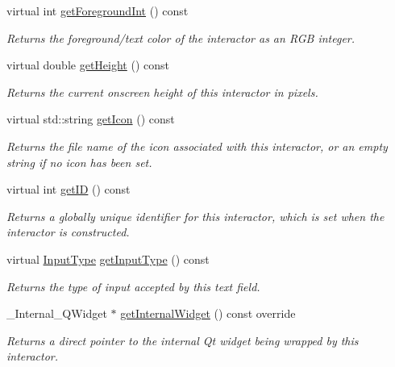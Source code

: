 \begin{DoxyCompactItemize}
virtual int \mbox{\hyperlink{classGInteractor_ac3b12ab385a6ef9ae90fc879860ba726}{get\+Foreground\+Int}} () const
\begin{DoxyCompactList}\small\item\em Returns the foreground/text color of the interactor as an R\+GB integer. \end{DoxyCompactList}\item 
virtual double \mbox{\hyperlink{classGInteractor_a1e7e353362434072875264cf95629f99}{get\+Height}} () const
\begin{DoxyCompactList}\small\item\em Returns the current onscreen height of this interactor in pixels. \end{DoxyCompactList}\item 
virtual std\+::string \mbox{\hyperlink{classGInteractor_aaed62a73004939a64da6f0eb9eb64d73}{get\+Icon}} () const
\begin{DoxyCompactList}\small\item\em Returns the file name of the icon associated with this interactor, or an empty string if no icon has been set. \end{DoxyCompactList}\item 
virtual int \mbox{\hyperlink{classGInteractor_a9c9659a6c6ba66b4107ba59c95a24241}{get\+ID}} () const
\begin{DoxyCompactList}\small\item\em Returns a globally unique identifier for this interactor, which is set when the interactor is constructed. \end{DoxyCompactList}\item 
virtual \mbox{\hyperlink{classGTextField_a5fc772c800c3d40d2b95564e8a839bab}{Input\+Type}} \mbox{\hyperlink{classGTextField_a69cc7c223d780203ab2852ee5a881753}{get\+Input\+Type}} () const
\begin{DoxyCompactList}\small\item\em Returns the type of input accepted by this text field. \end{DoxyCompactList}\item 
\+\_\+\+Internal\+\_\+\+Q\+Widget $\ast$ \mbox{\hyperlink{classGTextField_a2f6b36b2517087dc90a366b5ce1f5323}{get\+Internal\+Widget}} () const override
\begin{DoxyCompactList}\small\item\em Returns a direct pointer to the internal Qt widget being wrapped by this interactor. \end{DoxyCompactList}\item 

\end{DoxyCompactItemize}
